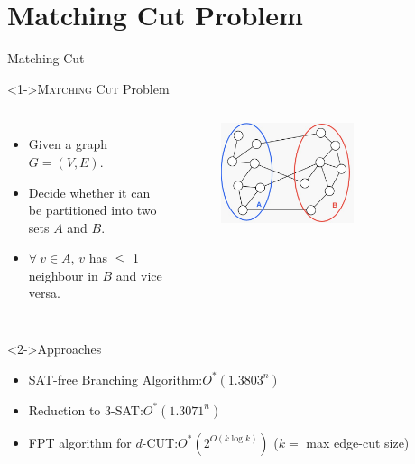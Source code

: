 \documentclass[
	xcolor={svgnames},
	hyperref={pagebackref,bookmarks},
	aspectratio=43,
]{beamer}
\begin{document}
\section{Matching Cut Problem}
\begin{frame}{Matching Cut}
	\vspace*{-4mm}
	\begin{block}<1->{\textsc{Matching Cut} Problem}
		\vspace{-6mm}
		\begin{columns} %
			\begin{itemize}
				\item Given a graph $G = (V, E)$.
				\item Decide whether it can be partitioned into two sets $A$ and $B$.
				\item $\forall\ v \in A$, $v$ has $\leq$ 1 neighbour in $B$ and vice versa.
			\end{itemize}
			\begin{figure}  \hspace{-15mm}
				\centering
				\includegraphics[width=0.65\textwidth]{images/matching-cut.jpeg}
			\end{figure}
		\end{columns}
	\end{block}
	\vspace*{-2mm}
	\begin{block}<2->{Approaches}
		\begin{itemize}
			\item \textsc{SAT}-free Branching Algorithm:\footnotemark[1]  $O^*(1.3803^n)$ 
			\item Reduction to \textsc{3-SAT}:\footnotemark[1]  $O^*(1.3071^n)$
			\item FPT algorithm for $d$-CUT:\footnotemark[2] $O^*(2^{O(k \log{k})})$ \hspace{3mm} ($k = $ max edge-cut size) 
		\end{itemize}
	\end{block}
\end{frame}
\end{document}
